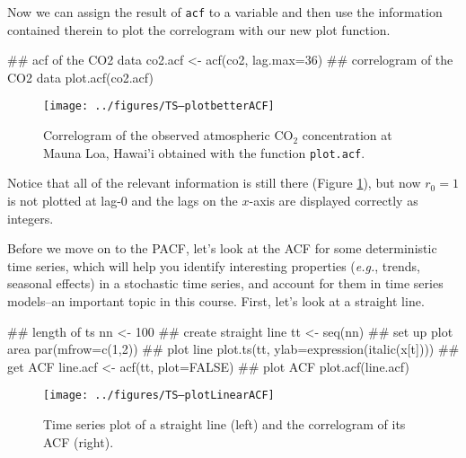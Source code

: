 Now we can assign the result of \texttt{acf} to a variable and then use the information contained therein to plot the correlogram with our new plot function.

\begin{Schunk}
\begin{Sinput}
 ## acf of the CO2 data
 co2.acf <- acf(co2, lag.max=36)
 ## correlogram of the CO2 data
 plot.acf(co2.acf)
\end{Sinput}
\end{Schunk}


\begin{figure}[htp]
\begin{center}
\texttt{[image: ../figures/TS--plotbetterACF]}
\end{center}
\caption{Correlogram of the observed atmospheric CO$_2$ concentration at Mauna Loa, Hawai'i obtained with the function \texttt{plot.acf}.}
         \label{fig:LW1.figOwnACF}
         \end{figure}

\noindent Notice that all of the relevant information is still there (Figure \ref{fig:LW1.figOwnACF}), but now $r_0=1$ is not plotted at lag-0 and the lags on the $x$-axis are displayed correctly as integers.

Before we move on to the PACF, let's look at the ACF for some deterministic time series, which will help you identify interesting properties (\emph{e.g.}, trends, seasonal effects) in a stochastic time series, and account for them in time series models--an important topic in this course.  First, let's look at a straight line.

\begin{Schunk}
\begin{Sinput}
 ## length of ts
 nn <- 100
 ## create straight line
 tt <- seq(nn)
 ## set up plot area
 par(mfrow=c(1,2))
 ## plot line
 plot.ts(tt, ylab=expression(italic(x[t])))
 ## get ACF
 line.acf <- acf(tt, plot=FALSE)
 ## plot ACF
 plot.acf(line.acf)
\end{Sinput}
\end{Schunk}

  
\begin{figure}[htp]
\begin{center}
\texttt{[image: ../figures/TS--plotLinearACF]}
\end{center}
\caption{Time series plot of a straight line (left) and the correlogram of its ACF (right).}
\label{fig:LW1.figLinearACF}
\end{figure}

